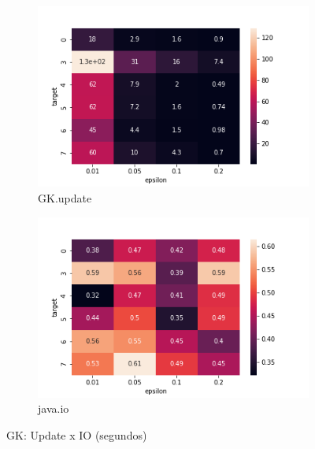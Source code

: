 \documentclass[11pt]{article}
\begin{document}
\begin{figure}[H]
\begin{subfigure}{.5\textwidth}
  \centering
  \includegraphics[width=.9\linewidth]{../../img/QUANTIL_heatmap_TEMPO_UPDATE.png}
  \caption{GK.update}
  \label{fig:sub-first}
\end{subfigure}
\begin{subfigure}{.5\textwidth}
  \centering
  \includegraphics[width=.9\linewidth]{../../img/QUANTIL_heatmap_TEMPO_IO.png}
  \caption{java.io}
\end{subfigure}
\caption{GK: Update x IO (segundos)}
\end{figure}
\end{document}
